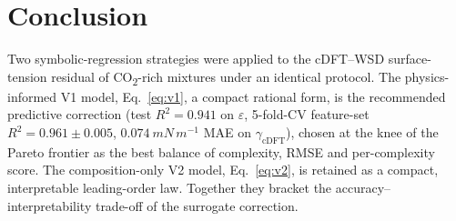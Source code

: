 \documentclass[11pt]{article}
\newcommand{\eps}{\varepsilon}
\newcommand{\gcDFT}{\gamma_{\mathrm{cDFT}}}
\begin{document}
\section{Conclusion}

Two symbolic-regression strategies were applied to the cDFT--WSD
surface-tension residual of CO\textsubscript{2}-rich mixtures under an
identical protocol. The physics-informed V1 model,
Eq.~\eqref{eq:v1}, a compact rational form, is the recommended predictive
correction (test $R^2=0.941$ on $\eps$, 5-fold-CV feature-set
$R^2=0.961\pm0.005$, $\SI{0.074}{mN\,m^{-1}}$ MAE on $\gcDFT$), chosen at the
knee of the Pareto frontier as the best balance of complexity, RMSE and
per-complexity score. The
composition-only V2 model, Eq.~\eqref{eq:v2}, is retained as a compact,
interpretable leading-order law. Together they bracket the
accuracy--interpretability trade-off of the surrogate correction.
\end{document}
